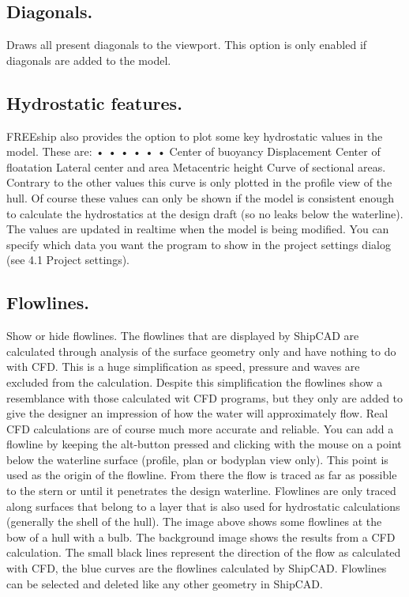 \documentclass[12pt]{article}
\begin{document}
\subsection{Diagonals.}
Draws all present diagonals to the viewport. This option is only enabled if diagonals are added to
the model.

\subsection{Hydrostatic features.} \label{hydrostatic-features}
FREEship also provides the option to plot some key hydrostatic values in the model. These are:
•
•
•
•
•
•
Center of buoyancy
Displacement
Center of floatation
Lateral center and area
Metacentric height
Curve of sectional areas. Contrary to the other values this curve is only plotted in the profile view
of the hull. Of course these values can only be shown if the model is consistent enough to
calculate the hydrostatics at the design draft (so no leaks below the waterline). The values are
updated in realtime when the model
is being modified. You can specify
which data you want the program to
show in the project settings dialog
(see 4.1 Project settings).

\subsection{Flowlines.}
Show or hide flowlines. The flowlines that are displayed by ShipCAD are calculated through
analysis of the surface geometry only and have nothing to do with CFD. This is a huge simplification
as speed, pressure and waves are excluded from the calculation. Despite this simplification the
flowlines show a resemblance with those calculated wit CFD programs, but they only are added to
give the designer an impression of how the water will approximately flow. Real CFD calculations are
of course much more accurate and
reliable. You can add a flowline by
keeping the alt-button pressed and
clicking with the mouse on a point below
the waterline surface (profile, plan or
bodyplan view only). This point is used as
the origin of the flowline. From there the
flow is traced as far as possible to the
stern or until it penetrates the design
waterline. Flowlines are only traced along
surfaces that belong to a layer that is
also used for hydrostatic calculations (generally the shell of the hull). The image above shows some
flowlines at the bow of a hull with a bulb. The background image shows the results from a CFD
calculation. The small black lines represent the direction of the flow as calculated with CFD, the blue
curves are the flowlines calculated by ShipCAD. Flowlines can be selected and deleted like any
other geometry in ShipCAD.
\end{document}
